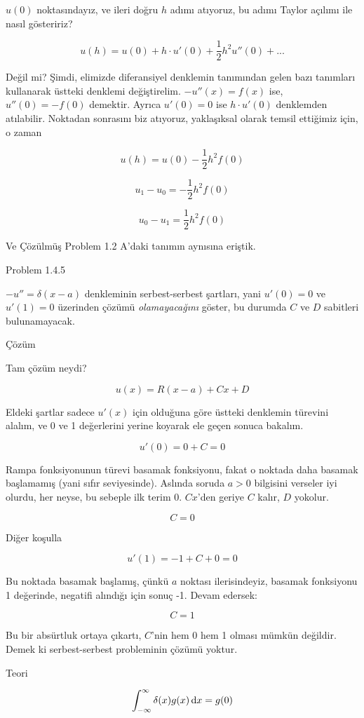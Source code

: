 \documentclass[12pt,fleqn]{article}\usepackage{../../common}
\begin{document}
$u(0)$ noktasındayız, ve ileri doğru $h$ adımı atıyoruz, bu adımı Taylor
açılımı ile nasıl gösteririz?

$$ u(h) = u(0) + h \cdot u'(0) + \frac{1}{2}h^2u''(0) + ... $$

Değil mi? Şimdi, elimizde diferansiyel denklemin tanımından gelen bazı
tanımları kullanarak üstteki denklemi değiştirelim. $-u''(x) = f(x)$ ise,
$u''(0) = -f(0)$ demektir. Ayrıca $u'(0) = 0$ ise $h \cdot u'(0)$
denklemden atılabilir. Noktadan sonrasını biz atıyoruz, yaklaşıksal olarak
temsil ettiğimiz için, o zaman

$$ u(h) = u(0) - \frac{1}{2}h^2f(0) $$

$$ u_1 - u_0 = -\frac{1}{2}h^2f(0)$$

$$ u_0 - u_1 = \frac{1}{2}h^2f(0) $$

Ve Çözülmüş Problem 1.2 A'daki tanımın aynısına eriştik. 

Problem 1.4.5

$-u''= \delta(x-a)$ denkleminin serbest-serbest şartları, yani $u'(0) = 0$
ve $u'(1) = 0$ üzerinden çözümü {\em olamayacağını} göster, bu durumda $C$
ve $D$ sabitleri bulunamayacak. 

Çözüm

Tam çözüm neydi? 

$$ u(x) = R(x-a) + Cx + D $$

Eldeki şartlar sadece $u'(x)$ için olduğuna göre üstteki denklemin türevini
alalım, ve 0 ve 1 değerlerini yerine koyarak ele geçen sonuca bakalım. 

$$ u'(0) = 0 + C = 0 $$

Rampa fonksiyonunun türevi basamak fonksiyonu, fakat o noktada daha basamak
başlamamış (yani sıfır seviyesinde). Aslında soruda $a > 0$ bilgisini
verseler iyi olurdu, her neyse, bu sebeple ilk terim 0. $Cx$'den geriye $C$
kalır, $D$ yokolur.

$$ C = 0 $$

Diğer koşulla

$$ u'(1) = -1 + C + 0 = 0 $$

Bu noktada basamak başlamış, çünkü $a$ noktası ilerisindeyiz, 
basamak fonksiyonu 1 değerinde, negatifi alındığı için sonuç -1. Devam
edersek: 

$$ C = 1 $$

Bu bir absürtluk ortaya çıkartı, $C$'nin hem 0 hem 1 olması mümkün
değildir. Demek ki serbest-serbest probleminin çözümü yoktur. 

Teori

$$ \int_{-\infty}^{\infty} \delta(x)g(x) \,\mathrm{d} x = g(0)$$
\end{document}
